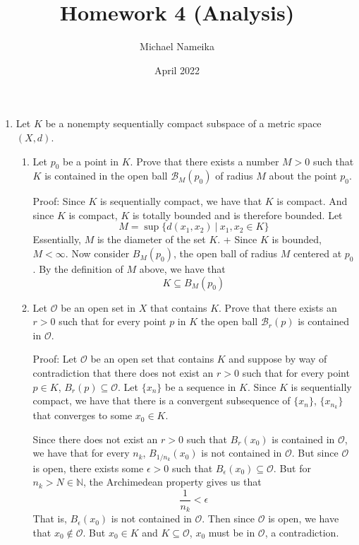 \documentclass{article}
\title{Homework 4 (Analysis)}
\author{Michael Nameika}
\date{April 2022}
\begin{document}
\maketitle

\begin{enumerate}
    \item Let $K$ be a nonempty sequentially compact subspace of a metric space $(X,d)$.
    \begin{enumerate}
        \item Let $p_0$ be a point in $K$. Prove that there exists a number $M > 0$ such that $K$ is contained in the open ball $\mathcal{B}_M(p_0)$ of radius $M$ about the point $p_0$.
        
        Proof: Since $K$ is sequentially compact, we have that $K$ is compact. And since $K$ is compact, $K$ is totally bounded and is therefore bounded. Let
        \[M = \sup{\{d(x_1,x_2) \:|\: x_1, x_2 \in K\}}\]
        Essentially, $M$ is the diameter of the set $K$.
        +
        Since $K$ is bounded, $M < \infty$. Now consider $B_M(p_0)$, the open ball of radius $M$ centered at $p_0$. By the definition of $M$ above, we have that
        \[K \subseteq B_M(p_0)\]
        
        
        
        
        \item Let $\mathcal{O}$ be an open set in $X$ that contains $K$. Prove that there exists an $r > 0$ such that for every point $p$ in $K$ the open ball $\mathcal{B}_r(p)$ is contained in $\mathcal{O}$.
        
        
        Proof: Let $\mathcal{O}$ be an open set that contains $K$ and suppose by way of contradiction that there does not exist an $r > 0$ such that for every point $p \in K$, $B_r(p) \subseteq \mathcal{O}$. Let $\{x_n\}$ be a sequence in $K$. Since $K$ is sequentially compact, we have that there is a convergent subsequence of $\{x_n\}$, $\{x_{n_k}\}$ that converges to some $x_0 \in K$.
        
        Since there does not exist an $r > 0$ such that $B_r(x_0)$ is contained in $\mathcal{O}$, we have that for every $n_k$, $B_{1/n_k}(x_0)$ is not contained in $\mathcal{O}$. But since $\mathcal{O}$ is open, there exists some $\epsilon > 0$ such that $B_{\epsilon}(x_0) \subseteq \mathcal{O}$. 
        But for $n_k > N \in \mathbb{N}$, the Archimedean property gives us that
        \[\frac{1}{n_k} < \epsilon\]
        That is, $B_{\epsilon}(x_0)$ is not contained in $\mathcal{O}$. Then since $\mathcal{O}$ is open, we have that $x_0 \notin \mathcal{O}$. But $x_0 \in K$ and $K \subseteq \mathcal{O}$, $x_0$ must be in $\mathcal{O}$, a contradiction.
        

\end{enumerate}
\end{enumerate}
\end{document}
